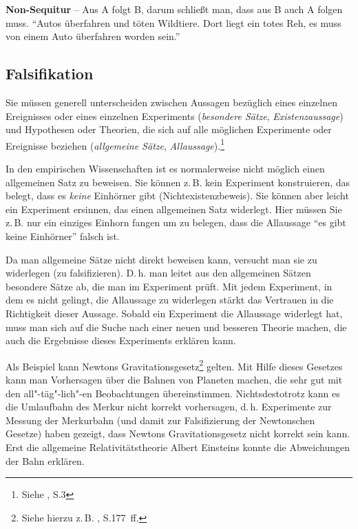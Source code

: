 \documentclass[a4paper,11pt,headings=normal]{scrartcl}
\begin{document}
\vspace{0.3cm}\noindent\textbf{Non-Sequitur} -- Aus A folgt B, darum schließt man, dass aus B auch A folgen muss. "`Autos überfahren und töten Wildtiere. Dort liegt ein totes Reh, es muss von einem Auto überfahren worden sein."'

\subsection{Falsifikation}

Sie müssen generell unterscheiden zwischen Aussagen bezüglich eines einzelnen Ereignisses oder eines einzelnen Experiments (\textit{besondere Sätze}, \textit{Existenzaussage}) und Hypothesen oder Theorien, die sich auf alle möglichen Experimente oder Ereignisse beziehen (\textit{allgemeine Sätze}, \textit{Allaussage}).\footnote{Siehe \autocite{Popper1969}, S.3}

In den empirischen Wissenschaften ist es normalerweise nicht möglich einen allgemeinen Satz zu beweisen. Sie können z.\,B. kein Experiment konstruieren, das belegt, dass es \textit{keine} Einhörner gibt (Nichtexistenzbeweis). Sie können aber leicht ein Experiment ersinnen, das einen allgemeinen Satz widerlegt. Hier müssen Sie z.\,B. nur ein einziges Einhorn fangen um zu belegen, dass die Allaussage "`es gibt keine Einhörner"' falsch ist.

Da man allgemeine Sätze nicht direkt beweisen kann, versucht man sie zu widerlegen (zu falsifizieren). D.\,h. man leitet aus den allgemeinen Sätzen besondere Sätze ab, die man im Experiment prüft. Mit jedem Experiment, in dem es nicht gelingt, die Allaussage zu widerlegen stärkt das Vertrauen in die Richtigkeit dieser Aussage. Sobald ein Experiment die Allaussage widerlegt hat, muss man sich auf die Suche nach einer neuen und besseren Theorie machen, die auch die Ergebnisse dieses Experiments erklären kann.

Als Beispiel kann Newtons Gravitationsgesetz\footnote{Siehe hierzu z.\,B. \autocite{Giancoli2010}, S.177~ff.} gelten. Mit Hilfe dieses Gesetzes kann man Vorhersagen über die Bahnen von Planeten machen, die sehr gut mit den all"-täg"-lich"-en Beobachtungen übereinstimmen. Nichtsdestotrotz kann es die Umlaufbahn des Merkur nicht korrekt vorhersagen, d.\,h. Experimente zur Messung der Merkurbahn (und damit zur Falsifizierung der Newtonschen Gesetze) haben gezeigt, dass Newtons Gravitationsgesetz nicht korrekt sein kann. Erst die allgemeine Relativitätstheorie Albert Einsteins konnte die Abweichungen der Bahn erklären.
\end{document}
